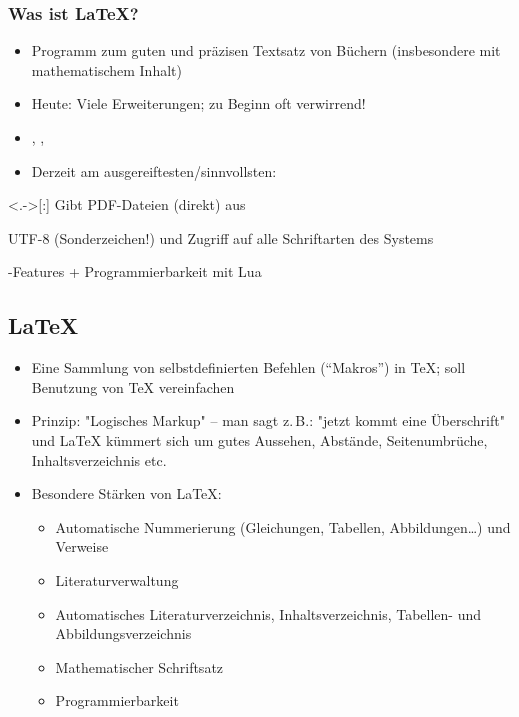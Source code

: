 \begin{frame}[<+->]
	\frametitle{Was ist \LaTeX?}
	\visible<+->{\textcolor{gray}{; aktuelle Version: 3.14159265}}
	\begin{itemize}
	\item Programm zum guten und präzisen Textsatz von Büchern (insbesondere mit mathematischem Inhalt)
	\item Heute: Viele Erweiterungen; zu Beginn oft verwirrend!
	\item %
	, , 
	\item Derzeit am ausgereiftesten/sinnvollsten: 
	\end{itemize}
	\begin{block}{}
		\begin{description}
		\item<.->[:] Gibt PDF-Dateien (direkt) aus
		\item[\hologo{XeTeX}:] UTF-8 (Sonderzeichen!) und Zugriff auf alle Schriftarten des Systems
		\item[\hologo{LuaTeX}:] -Features + Programmierbarkeit mit Lua
		\end{description}
	\end{block}
\end{frame}

\subsection{\LaTeX}

\begin{frame}[<+->]
	\begin{itemize}
	\item Eine Sammlung von selbstdefinierten Befehlen (\enquote{Makros}) in \TeX; soll Benutzung von {\TeX} vereinfachen
	\item Prinzip: "Logisches Markup" – man sagt z.\,B.: "jetzt kommt eine Überschrift" und {\LaTeX} kümmert sich um gutes Aussehen, Abstände, Seitenumbrüche, Inhaltsverzeichnis etc.
	\item Besondere Stärken von \LaTeX:
		\begin{itemize}
		\item Automatische Nummerierung (Gleichungen, Tabellen, Abbildungen\dots) und Verweise
		\item Literaturverwaltung
		\item Automatisches Literaturverzeichnis, Inhaltsverzeichnis, Tabellen- und Abbildungsverzeichnis
		\item Mathematischer Schriftsatz
		\item Programmierbarkeit
		\end{itemize}
	\end{itemize}
\end{frame}

